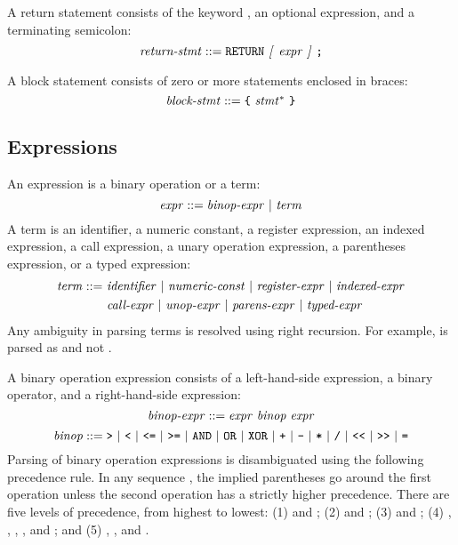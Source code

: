 \documentclass[10pt]{article}
\begin{document}
 A return statement consists of the keyword
, an optional expression, and a terminating semicolon:
%
$$\mbox{\textit{return-stmt}} ::= \mbox{\texttt{RETURN} \textit{[} \ensuremath{\mbox{\textit{expr}}} \textit{]}
    \texttt{;}}$$

 A block statement consists of zero or more
statements enclosed in braces:
%
$$\mbox{\textit{block-stmt}} ::= \mbox{\texttt{\{} \ensuremath{\mbox{\textit{stmt}}}$^*$
  \texttt{\}}}$$

\subsection{Expressions}
\label{sec:syntax:expressions}

An expression is a binary operation or a term:
%
$$\mbox{\textit{expr}} ::= \mbox{\ensuremath{\mbox{\textit{binop-expr}}} $|$ \ensuremath{\mbox{\textit{term}}}}$$
%
A term is an identifier, a numeric constant, a register expression, an
indexed expression, a call expression, a unary operation expression, a
parentheses expression, or a typed expression:
%
\begin{equation*}
\begin{split}
%
\nonterm{term} ::= \,\, & \mbox{\nonterm{identifier} $|$
  \nonterm{numeric-const} $|$
  \nonterm{register-expr} $|$
  \nonterm{indexed-expr}} \\
& \mbox{\nonterm{call-expr} $|$ 
  \nonterm{unop-expr} $|$
  \nonterm{parens-expr} $|$ 
  \nonterm{typed-expr}}
%
\end{split}
\end{equation*}
%
Any ambiguity in parsing terms is resolved using right recursion.  For
example,  is parsed as  and not .

 A binary operation expression
consists of a left-hand-side expression, a binary operator, and a
right-hand-side expression:
%
$$\mbox{\textit{binop-expr}} ::= \mbox{\ensuremath{\mbox{\textit{expr}}} \ensuremath{\mbox{\textit{binop}}}
  \ensuremath{\mbox{\textit{expr}}}}$$
%
$$\mbox{\textit{binop}} ::= \mbox{\texttt{>} $|$ \texttt{<} $|$ \texttt{<=} $|$
  \texttt{>=} $|$ \texttt{AND} $|$ \texttt{OR} $|$ \texttt{XOR} $|$ \texttt{+} $|$
  \texttt{-} $|$ \texttt{*} $|$ \texttt{/} $|$ \texttt{<}\texttt{<}~$|$ \texttt{>}\texttt{>}~$|$
  \texttt{=}}$$
%
Parsing of binary operation expressions is disambiguated using the
following precedence rule.  In any sequence 
   ,
the implied parentheses go around the first operation unless the
second operation has a strictly higher precedence.  There are five
levels of precedence, from highest to lowest: (1) \kwd{<}\kwd{<} and
\kwd{>}\kwd{>}; (2) \kwd{*} and \kwd{\bs}; (3) \kwd{+} and \kwd{-};
(4) \kwd{=}, \kwd{>}, \kwd{<}, \kwd{<=}, and \kwd{>=}; and (5)
, , and .
\end{document}
